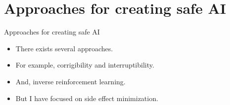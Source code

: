 \documentclass[10pt]{beamer}
\begin{document}
\section{Approaches for creating safe AI}

\begin{frame}{Approaches for creating safe AI}
  \begin{itemize}[<+- | alert@+>]
      \item There exists several approaches.
      \item For example, corrigibility and interruptibility.
      \item And, inverse reinforcement learning.
      \item But I have focused on side effect minimization.
  \end{itemize}
\end{frame}
\end{document}
